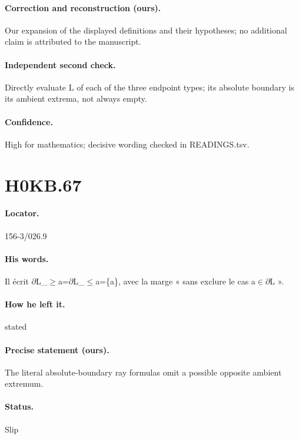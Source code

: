 \paragraph{Correction and reconstruction (ours).} Our expansion of the displayed definitions and their hypotheses; no additional claim is attributed to the manuscript.

\paragraph{Independent second check.} Directly evaluate L of each of the three endpoint types; its absolute boundary is its ambient extrema, not always empty.

\paragraph{Confidence.} High for mathematics; decisive wording checked in READINGS.tsv.

\section*{H0KB.67}\label{statement:H0KB.67}
\paragraph{Locator.} 156-3/026.9

\paragraph{His words.} Il écrit \ensuremath{\partial}L\_\ensuremath{\geq}a=\ensuremath{\partial}L\_\ensuremath{\leq}a=\{a\}, avec la marge « sans exclure le cas a\ensuremath{\in}\ensuremath{\partial}L ».

\paragraph{How he left it.} stated

\paragraph{Precise statement (ours).} The literal absolute-boundary ray formulas omit a possible opposite ambient extremum.

\paragraph{Status.} Slip

